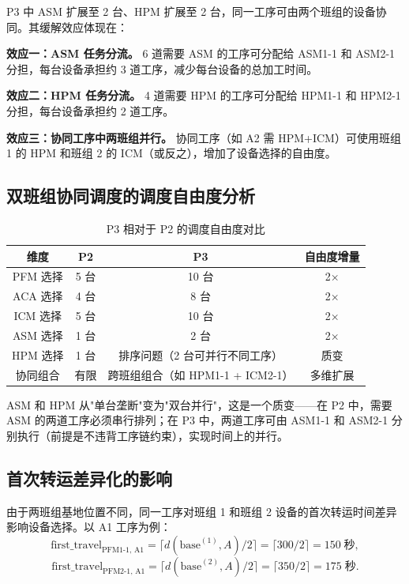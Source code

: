 \documentclass[UTF8,a4paper,12pt]{ctexart}
\begin{document}
P3 中 ASM 扩展至 2 台、HPM 扩展至 2 台，同一工序可由两个班组的设备协同。其缓解效应体现在：

\textbf{效应一：ASM 任务分流。} 6 道需要 ASM 的工序可分配给 ASM1-1 和 ASM2-1 分担，每台设备承担约 3 道工序，减少每台设备的总加工时间。

\textbf{效应二：HPM 任务分流。} 4 道需要 HPM 的工序可分配给 HPM1-1 和 HPM2-1 分担，每台设备承担约 2 道工序。

\textbf{效应三：协同工序中两班组并行。} 协同工序（如 A2 需 HPM+ICM）可使用班组 1 的 HPM 和班组 2 的 ICM（或反之），增加了设备选择的自由度。

\subsection{双班组协同调度的调度自由度分析}
\begin{table}[htbp]
  \centering
  \caption{P3 相对于 P2 的调度自由度对比}
  \label{tab:freedom_compare}
  \begin{tabular}{cccc}
    \toprule
    维度 & P2 & P3 & 自由度增量 \\
    \midrule
    PFM 选择 & 5 台 & 10 台 & 2× \\
    ACA 选择 & 4 台 & 8 台 & 2× \\
    ICM 选择 & 5 台 & 10 台 & 2× \\
    ASM 选择 & 1 台 & 2 台 & 2× \\
    HPM 选择 & 1 台 & 排序问题（2 台可并行不同工序） & 质变 \\
    协同组合 & 有限 & 跨班组组合（如 HPM1-1 + ICM2-1） & 多维扩展 \\
    \bottomrule
  \end{tabular}
\end{table}

ASM 和 HPM 从"单台垄断"变为"双台并行"，这是一个质变——在 P2 中，需要 ASM 的两道工序必须串行排列；在 P3 中，两道工序可由 ASM1-1 和 ASM2-1 分别执行（前提是不违背工序链约束），实现时间上的并行。

\subsection{首次转运差异化的影响}
由于两班组基地位置不同，同一工序对班组 1 和班组 2 设备的首次转运时间差异影响设备选择。以 A1 工序为例：
$$
\text{first\_travel}_{\text{PFM1-1, A1}} = \lceil d(\text{base}^{(1)}, A) / 2 \rceil = \lceil 300 / 2 \rceil = 150 \; \text{秒},
$$
$$
\text{first\_travel}_{\text{PFM2-1, A1}} = \lceil d(\text{base}^{(2)}, A) / 2 \rceil = \lceil 350 / 2 \rceil = 175 \; \text{秒}.
$$
\end{document}
